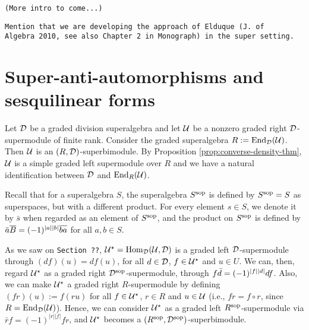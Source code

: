 \documentclass{amsbook}
\begin{document}
\vspace{5mm}
{\tt (More intro to come...)}


{\tt Mention that we are developing the approach of Elduque (J. of \\Al\-ge\-bra 2010, see also Chapter 2 in Monograph) in the super setting.}


\section{Super-anti-automorphisms and sesquilinear forms}\label{sec:super-anti-auto-and-sesquilinear}

Let $\mathcal{D}$ be a graded division superalgebra and let $\mathcal U$ be a nonzero graded right $\mathcal{D}$-supermodule of finite rank. 
Consider the graded superalgebra $R := \operatorname{End}_{\mathcal{D}}(\mathcal U)$. 
Then $\mathcal U$ is an $(R, \mathcal{D})$-superbimodule. 
By Proposition \ref{prop:converse-density-thm}, $\mathcal U$ is a simple graded left supermodule over $R$ and we have a natural identification between $\mathcal{D}$ and $\operatorname{End}_R(\mathcal U)$.

Recall that for a superalgebra $S$, the superalgebra $S^{\mathrm{sop}}$ is defined by $S^{\mathrm{sop}} = S$ as superspaces, but with a different product. For every element $s\in S$, we denote it by $\bar s$ when regarded as an element of $S^{\mathrm{sop}}$, and the product on $S^{\mathrm{sop}}$ is defined by $\bar a \overline {B} = (-1)^{|a||b|} \overline{ba}$ for all $a, b \in S$.

As we saw on {\tt Section ??}, $\mathcal U^\star = \operatorname{Hom}_{\mathcal{D}} (\mathcal U, \mathcal{D})$ is a graded left $\mathcal{D}$-supermodule through $(df)(u) = df(u)$, for all $d\in \mathcal{D}$, $f\in \mathcal U^\star$ and $u\in U$. 
We can, then, regard $\mathcal U^\star$ as a graded right $\mathcal{D}^{\mathrm{sop}}$-supermodule, through $f \bar d = (-1)^{|f||d|} df$. 
Also, we can make $\mathcal U^\star$ a graded right $R$-supermodule by defining $(f r) (u) := f(r u)$ for all $f\in \mathcal U^\star$, $r\in R$ and $u\in \mathcal U$ (i.e., $f r = f \circ r$, since $R = \operatorname{End}_{\mathcal{D}}(\mathcal U)$). 
Hence, we can consider $\mathcal U^\star$ as a graded left $R^{\mathrm{sop}}$-supermodule via $\bar r f = (-1)^{|r||f|} f r$, %
and $\mathcal U^\star$ becomes a $(R^{\mathrm{sop}}, \mathcal{D}^{\mathrm{sop}})$-superbimodule.
\end{document}
